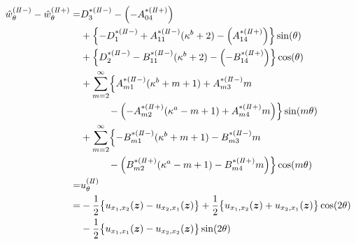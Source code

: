 \begin{align}
	\hat{w}_{\theta}^{(I\hspace{-.15em}I-)}-\hat{w}_{\theta}^{(I\hspace{-.15em}I+)} =&D_{3}^{*(I\hspace{-.15em}I-)}-\Bigl(-A_{04}^{*(I\hspace{-.15em}I+)}\Bigr)
	\nonumber
	\\
	&+\Bigl\{-D_{1}^{*(I\hspace{-.15em}I-)}+A_{11}^{*(I\hspace{-.15em}I-)}(\kappa^{b}+2)
	-\Bigl(A_{14}^{*(I\hspace{-.15em}I+)}\Bigr)\Bigr\}\sin(\theta)
	\nonumber
	\\
	&+\Bigl\{D_{2}^{*(I\hspace{-.15em}I-)}-B_{11}^{*(I\hspace{-.15em}I-)}(\kappa^{b}+2)
	-\Bigl(-B_{14}^{*(I\hspace{-.15em}I+)}\Bigr)\Bigr\}\cos(\theta)
	\nonumber
	\\
	&+\sum_{m=2}^{\infty}\Bigl\{A_{m1}^{*(I\hspace{-.15em}I-)}(\kappa^{b}+m+1)
	+A_{m3}^{*(I\hspace{-.15em}I-)}m
	\nonumber
	\\
	&\hspace{1.0cm}-\Bigl(-A_{m2}^{*(I\hspace{-.15em}I+)}(\kappa^{a}-m+1)
	+A_{m4}^{*(I\hspace{-.15em}I+)}m\Bigr)\Bigr\}\sin(m\theta)
	\nonumber
	\\
	&+\sum_{m=2}^{\infty}\Bigl\{-B_{m1}^{*(I\hspace{-.15em}I-)}(\kappa^{b}+m+1)
	-B_{m3}^{*(I\hspace{-.15em}I-)}m
	\nonumber
	\\
	&\hspace{1.0cm}-\Bigl(B_{m2}^{*(I\hspace{-.15em}I+)}(\kappa^{a}-m+1)
	-B_{m4}^{*(I\hspace{-.15em}I+)}m\Bigr)\Bigr\}\cos(m\theta)
	\nonumber
	\\
	=&u_{\theta}^{(I\hspace{-.15em}I)}
	\nonumber
	\\
	=&-\frac{1}{2}\bigl\{u_{x_{1},x_{2}}(\bm{z})-u_{x_{2},x_{1}}(\bm{z})\bigr\}
	+\frac{1}{2}\bigl\{u_{x_{1},x_{2}}(\bm{z})+u_{x_{2},x_{1}}(\bm{z})\bigr\}\cos(2\theta)
	\nonumber
	\\
	&-\frac{1}{2}\bigl\{u_{x_{1},x_{1}}(\bm{z})-u_{x_{2},x_{2}}(\bm{z})\bigr\}\sin(2\theta)
	\label{eq:UTh2eq}
\end{align}

